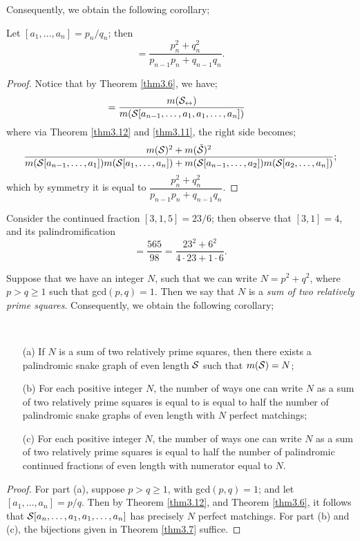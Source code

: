 Consequently, we obtain the following corollary;
\begin{corollary}\label{cor3.10}
    Let $[a_1,\dots,a_n] = p_n/q_n$; then
    \begin{equation*}
        [a_n,\dots,a_1,a_1,\dots,a_n] = \dfrac{p_n^2 + q_n^2}{p_{n-1}p_n + q_{n-1}q_n}.
    \end{equation*}
\end{corollary}
\begin{proof}
    Notice that by Theorem \ref{thm3.6}, we have;
    \begin{align}
        [a_n,\dots,a_1,a_1,\dots,a_n] &= \dfrac{m(\pal{\s})}{m(\s[a_{n-1},\dots,a_1,a_1,\dots,a_n])}
    \end{align}
    where via Theorem \ref{thm3.12} and \ref{thm3.11}, the right side becomes;
    \begin{equation*}
        \dfrac{m(\mathcal{S})^2 + m(\Tilde{\mathcal{S}})^2}{m(\mathcal{S}[a_{n-1},\dots,a_1])m(\mathcal{S}[a_1,\dots,a_n])+ m(\mathcal{S}[a_{n-1},\dots,a_2])m(\mathcal{S}[a_2,\dots,a_n])};
    \end{equation*}
    which by symmetry it is equal to $ \dfrac{p_n^2 + q_n^2}{p_{n-1}p_n + q_{n-1}q_n}$.
\end{proof}
\begin{example}
    Consider the continued fraction $[3,1,5] = 23/6$; then observe that $[3,1] = 4$, and its palindromification
    \begin{equation*}
        [5,1,3,3,1,5] = \dfrac{565}{98}= \dfrac{23^2 + 6^2}{4 \cdot 23 + 1 \cdot 6}.
    \end{equation*}
\end{example}
Suppose that we have an integer $N$, such that we can write $N = p^2 + q^2$, where $p > q \geq 1$ such that gcd$(p,q) = 1$. Then we say that $N$ is a \emph{sum of two relatively prime squares}. Consequently, we obtain the following corollary;
\begin{corollary}~ 
    \begin{itemize}
        \item[(a)] If $N$ is a sum of two relatively prime squares, then there exists a palindromic snake graph of even length $\mathcal{S}$ such that $m(\mathcal{S}) = N$;
        \item[(b)] For each positive integer $N$, the number of ways one can write $N$ as a sum of two relatively prime squares is equal to is equal to half the number of palindromic snake graphs of even length with $N$ perfect matchings;
        \item[(c)] For each positive integer $N$, the number of ways one can write $N$ as a sum of two relatively prime squares is equal to half the number of palindromic continued fractions of even length with numerator equal to $N$. 
    \end{itemize}
\end{corollary}
\begin{proof}
    For part (a), suppose $p > q \geq 1$, with gcd$(p,q) = 1$; and let $[a_1,\dots,a_n] = p/q$. Then by Theorem \ref{thm3.12}, and Theorem \ref{thm3.6}, it follows that $\mathcal{S}[a_n,\dots,a_1,a_1,\dots,a_n]$ has precisely $N$ perfect matchings. For part (b) and (c), the bijections given in Theorem \ref{thm3.7} suffice.
\end{proof}
